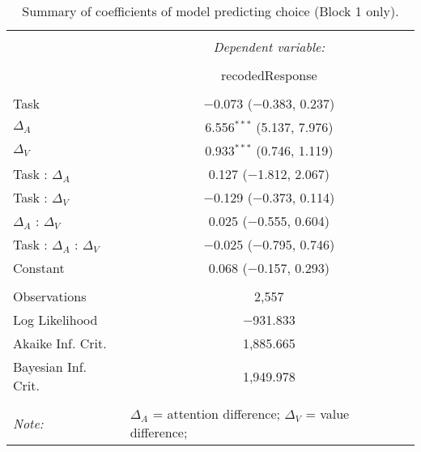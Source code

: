 
\begin{table}[!b] \centering 
  \caption{Summary of coefficients of model predicting choice (Block 1 only).} 
  \label{table:choiceModelBlock1} 
\begin{tabular}{@{\extracolsep{5pt}}lc} 
\\[-1.8ex]\hline 
\hline \\[-1.8ex] 
 & \multicolumn{1}{c}{\textit{Dependent variable:}} \\ 
\cline{2-2} 
\\[-1.8ex] & recodedResponse \\ 
\hline \\[-1.8ex] 
 Task & $-$0.073 ($-$0.383, 0.237) \\ 
  $\Delta_A$ & 6.556$^{***}$ (5.137, 7.976) \\ 
  $\Delta_V$ & 0.933$^{***}$ (0.746, 1.119) \\ 
  Task : $\Delta_A$ & 0.127 ($-$1.812, 2.067) \\ 
  Task : $\Delta_V$ & $-$0.129 ($-$0.373, 0.114) \\ 
  $\Delta_A$ : $\Delta_V$ & 0.025 ($-$0.555, 0.604) \\ 
  Task : $\Delta_A$ :  $\Delta_V$ & $-$0.025 ($-$0.795, 0.746) \\ 
  Constant & 0.068 ($-$0.157, 0.293) \\ 
 \hline \\[-1.8ex] 
Observations & 2,557 \\ 
Log Likelihood & $-$931.833 \\ 
Akaike Inf. Crit. & 1,885.665 \\ 
Bayesian Inf. Crit. & 1,949.978 \\ 
\hline 
\hline \\[-1.8ex] 
\textit{Note:}  & \multicolumn{1}{l}{\footnotesize $\Delta_A$ = attention difference; $\Delta_V$ = value difference; } \\ 
\end{tabular} 
\end{table} 
